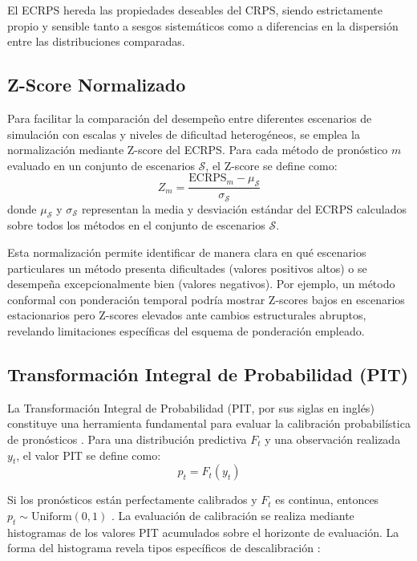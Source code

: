 El ECRPS hereda las propiedades deseables del CRPS, siendo estrictamente propio y sensible tanto a sesgos sistemáticos como a diferencias en la dispersión entre las distribuciones comparadas.



\subsection{Z-Score Normalizado}

Para facilitar la comparación del desempeño entre diferentes escenarios de simulación con escalas y niveles de dificultad heterogéneos, se emplea la normalización mediante Z-score del ECRPS. Para cada método de pronóstico $m$ evaluado en un conjunto de escenarios $\mathcal{S}$, el Z-score se define como:
\begin{equation}
Z_m = \frac{\text{ECRPS}_m - \mu_{\mathcal{S}}}{\sigma_{\mathcal{S}}}
\label{eq:zscore}
\end{equation}
donde $\mu_{\mathcal{S}}$ y $\sigma_{\mathcal{S}}$ representan la media y desviación estándar del ECRPS calculados sobre todos los métodos en el conjunto de escenarios $\mathcal{S}$.

Esta normalización permite identificar de manera clara en qué escenarios particulares un método presenta dificultades (valores positivos altos) o se desempeña excepcionalmente bien (valores negativos). Por ejemplo, un método conformal con ponderación temporal podría mostrar Z-scores bajos en escenarios estacionarios pero Z-scores elevados ante cambios estructurales abruptos, revelando limitaciones específicas del esquema de ponderación empleado.

\subsection{Transformación Integral de Probabilidad (PIT)}

La Transformación Integral de Probabilidad (PIT, por sus siglas en inglés) constituye una herramienta fundamental para evaluar la calibración probabilística de pronósticos \parencite{Dawid1984, DieboldGunther1998}. Para una distribución predictiva $F_t$ y una observación realizada $y_t$, el valor PIT se define como:
\begin{equation}
p_t = F_t(y_t)
\label{eq:pit}
\end{equation}

Si los pronósticos están perfectamente calibrados y $F_t$ es continua, entonces $p_t \sim \text{Uniform}(0,1)$ \parencite{GneitingBalabdaoui2007}. La evaluación de calibración se realiza mediante histogramas de los valores PIT acumulados sobre el horizonte de evaluación. La forma del histograma revela tipos específicos de descalibración \parencite{Thorarinsdottir2017}:

